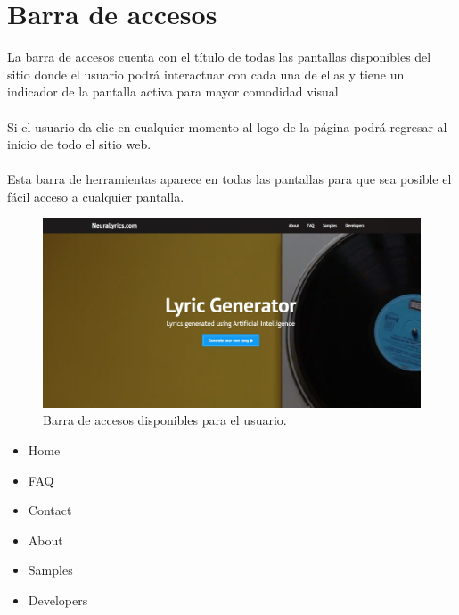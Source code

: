 \documentclass[12pt, a4paper, titlepage]{article}
\begin{document}
	\section{Barra de accesos}
	La barra de accesos cuenta con el título de todas las pantallas disponibles del sitio donde el usuario podrá interactuar con cada una de ellas y tiene un indicador de la pantalla activa para mayor comodidad visual.\\\\
	Si el usuario da clic en cualquier momento al logo de la página podrá regresar al inicio de todo el sitio web.\\\\
	Esta barra de herramientas aparece en todas las pantallas para que sea posible el fácil acceso a cualquier pantalla.
	
	\begin{figure}[H]
		\includegraphics[width=13.5cm]{./Imagenes/Capturas/pprincipal.jpg}
		\centering \caption{Barra de accesos disponibles para el usuario.}
	\end{figure}
	\begin{itemize}
		\item Home
		\item FAQ
		\item Contact
		\item About
		\item Samples
		\item Developers
	\end{itemize}
	\newpage
\end{document}
